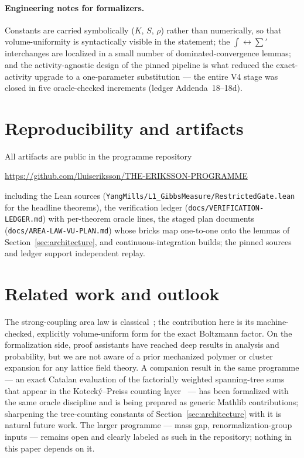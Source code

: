 \documentclass[11pt]{article}
\theoremstyle{remark}
\begin{document}
\paragraph{Engineering notes for formalizers.}
Constants are carried symbolically ($K$, $S$, $\rho$) rather than
numerically, so that volume-uniformity is syntactically visible in the
statement; the $\int\!\leftrightarrow\!\sum'$ interchanges are localized in
a small number of dominated-convergence lemmas; and the activity-agnostic
design of the pinned pipeline is what reduced the exact-activity upgrade to
a one-parameter substitution --- the entire V4 stage was closed in five
oracle-checked increments (ledger Addenda~18--18d).

\section{Reproducibility and artifacts}\label{sec:repro}

All artifacts are public in the programme repository
\begin{center}
\url{https://github.com/lluiseriksson/THE-ERIKSSON-PROGRAMME}
\end{center}
including the Lean sources (\texttt{YangMills/L1\_GibbsMeasure/RestrictedGate.lean}
for the headline theorems), the verification ledger
(\texttt{docs/VERIFICATION-LEDGER.md}) with per-theorem oracle lines, the
staged plan documents (\texttt{docs/AREA-LAW-VU-PLAN.md}) whose bricks map
one-to-one onto the lemmas of Section~\ref{sec:architecture}, and
continuous-integration builds; the pinned sources and ledger support
independent replay.

\section{Related work and outlook}\label{sec:related}

The strong-coupling area law is classical~\cite{OsterwalderSeiler1978,
Seiler1982}; the contribution here is its machine-checked, explicitly
volume-uniform form for the exact Boltzmann factor.  On the formalization
side, proof assistants have reached deep results in analysis and
probability, but we are not aware of a prior mechanized polymer or cluster
expansion for any lattice field theory.  A companion result in the same
programme --- an exact Catalan evaluation of the factorially weighted
spanning-tree sums that appear in the Koteck\'y--Preiss counting
layer~\cite{Eriksson2026Catalan} --- has been formalized with the same
oracle discipline and is being prepared as generic Mathlib contributions;
sharpening the tree-counting constants of Section~\ref{sec:architecture}
with it is natural future work.  The larger programme --- mass gap,
renormalization-group inputs --- remains open and clearly labeled as such
in the repository; nothing in this paper depends on it.
\end{document}
